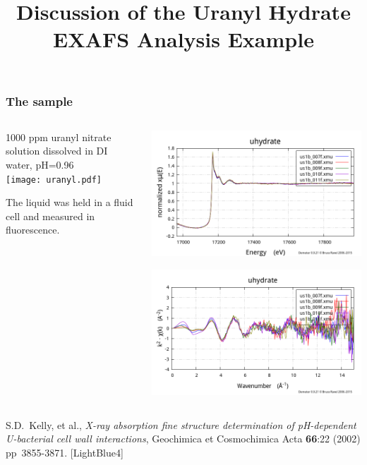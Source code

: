 \documentclass[10pt, xcolor=x11names, compress]{beamer}
\title{Discussion of the Uranyl Hydrate EXAFS Analysis Example}
\begin{document}
\maketitle


\begin{frame}
  \frametitle{The sample}
  \begin{columns}[T]
    \begin{column}{0.5\linewidth}
      1000 ppm uranyl nitrate solution dissolved in DI water, pH=0.96\\[3ex]

      \texttt{[image: uranyl.pdf]}

      \bigskip

      The liquid was held in a fluid cell and measured in fluorescence.
    \end{column}
    \begin{column}{0.5\linewidth}
      \includegraphics[width=\linewidth]{images/uhydrate_mu.png}

      \includegraphics[width=\linewidth]{images/uhydrate_chi.png}
    \end{column}
  \end{columns}

  \begin{bottomnote}[0.7][19.0]
    S.D.\ Kelly, et al., \textit{X-ray absorption fine structure
      determination of pH-dependent U-bacterial cell wall
      interactions}, Geochimica et Cosmochimica Acta \textbf{66}:22
    (2002) pp\  3855-3871.
    [LightBlue4]
  \end{bottomnote}
\end{frame}
\end{document}
